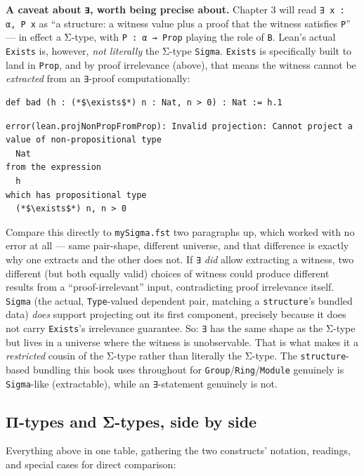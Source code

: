 \textbf{A caveat about \texttt{∃}, worth being precise about.} Chapter 3 will read \texttt{∃ x : α, P x} as ``a structure: a witness value plus a proof that the witness satisfies \texttt{P}'' --- in effect a Σ-type, with \texttt{P : α → Prop} playing the role of \texttt{B}. Lean's actual \texttt{Exists} is, however, \emph{not literally} the Σ-type \texttt{Sigma}. \texttt{Exists} is specifically built to land in \texttt{Prop}, and by proof irrelevance (above), that means the witness cannot be \emph{extracted} from an \texttt{∃}-proof computationally:

\begin{lstlisting}
def bad (h : (*$\exists$*) n : Nat, n > 0) : Nat := h.1
\end{lstlisting}

\begin{lstlisting}
error(lean.projNonPropFromProp): Invalid projection: Cannot project a
value of non-propositional type
  Nat
from the expression
  h
which has propositional type
  (*$\exists$*) n, n > 0
\end{lstlisting}

Compare this directly to \texttt{mySigma.fst} two paragraphs up, which worked with no error at all --- same pair-shape, different universe, and that difference is exactly why one extracts and the other does not. If \texttt{∃} \emph{did} allow extracting a witness, two different (but both equally valid) choices of witness could produce different results from a ``proof-irrelevant'' input, contradicting proof irrelevance itself. \texttt{Sigma} (the actual, \texttt{Type}-valued dependent pair, matching a \texttt{structure}'s bundled data) \emph{does} support projecting out its first component, precisely because it does not carry \texttt{Exists}'s irrelevance guarantee. So: \texttt{∃} has the same shape as the Σ-type but lives in a universe where the witness is unobservable. That is what makes it a \emph{restricted} cousin of the Σ-type rather than literally the Σ-type. The \texttt{structure}-based bundling this book uses throughout for \texttt{Group}/\texttt{Ring}/\texttt{Module} genuinely is \texttt{Sigma}-like (extractable), while an \texttt{∃}-statement genuinely is not.

\subsection{Π-types and Σ-types, side by side}\label{sec:01-basics:05-pi-sigma-and-coc:6}

Everything above in one table, gathering the two constructs' notation, readings, and special cases for direct comparison:

